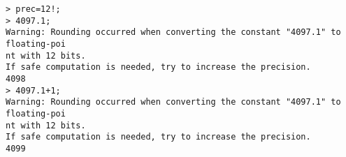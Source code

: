 \begin{center}\begin{minipage}{15cm}\begin{Verbatim}[frame=single]
> prec=12!;
> 4097.1;
Warning: Rounding occurred when converting the constant "4097.1" to floating-poi
nt with 12 bits.
If safe computation is needed, try to increase the precision.
4098
> 4097.1+1;
Warning: Rounding occurred when converting the constant "4097.1" to floating-poi
nt with 12 bits.
If safe computation is needed, try to increase the precision.
4099
\end{Verbatim}
\end{minipage}\end{center}
